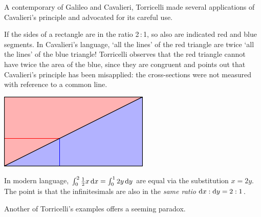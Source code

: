 \goodbreak

 A contemporary of Galileo and Cavalieri, Torricelli made several applications of Cavalieri's principle and advocated for its careful use.

\begin{minipage}[t]{0.7\linewidth}\vspace{0pt}
If the sides of a rectangle are in the ratio 2\,:\,1, so also are indicated red and blue segments. In Cavalieri's language, `all the lines' of the red triangle are twice `all the lines' of the blue triangle! Torricelli observes that the red triangle cannot have twice the area of the blue, since they are congruent and points out that Cavalieri's principle has been misapplied: the cross-sections were not measured with reference to a common line.
\end{minipage}\hfill\begin{minipage}[t]{0.29\linewidth}\vspace{0pt}
\flushright\includegraphics{analytic-torri1}
\end{minipage}\medbreak

In modern language, $\int_0^2\frac 12x\,{\mathrm{d} x}=\int_0^12y\,{\mathrm{d} y}$ are equal via the substitution $x=2y$. The point is that the infinitesimals are also in the \emph{same ratio} ${\mathrm{d} x}:{\mathrm{d} y}=2:1$.\bigbreak


Another of Torricelli's examples offers a seeming paradox.

